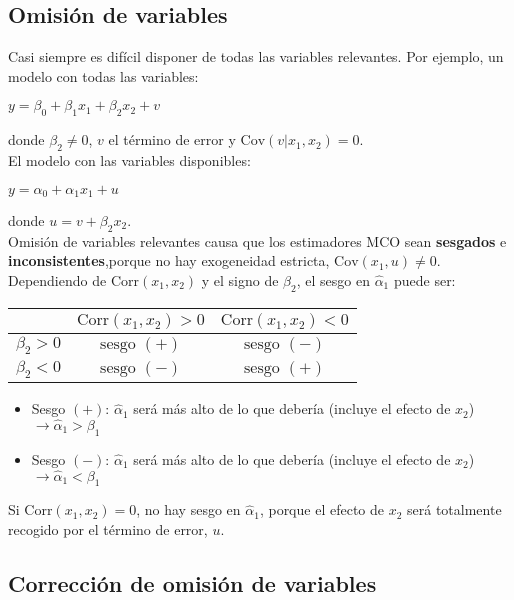 \documentclass[10pt, a4paper, landscape]{extarticle}
\newcommand{\Cov}{\mathrm{Cov}}
\newcommand{\Corr}{\mathrm{Corr}}
\begin{document}
\begin{multicols}{3}
\section*{Omisión de variables}
	Casi siempre es difícil disponer de todas las variables relevantes. Por ejemplo, un modelo con todas las variables:
	\begin{center}
		$y = \beta_0 + \beta_1 x_1 + \beta_2 x_2 + v$
	\end{center}
	\quad donde $\beta_2 \neq 0$, $v$ el término de error y $\Cov(v|x_1,x_2) = 0$. \\
	El modelo con las variables disponibles:
	\begin{center}
		$y = \alpha_0 + \alpha_1 x_1 + u$
	\end{center}
	\quad donde $u = v + \beta_2 x_2$. \\
	Omisión de variables relevantes causa que los estimadores MCO sean \textbf{sesgados} e \textbf{inconsistentes},porque no hay exogeneidad estricta, $\Cov(x_1,u) \neq 0$. Dependiendo de $\Corr(x_1, x_2)$ y el signo de $\beta_2$, el sesgo en $\hat{\alpha}_1$ puede ser:
	\begin{center}
		\begin{tabular}{ c | c  c }
			\multicolumn{1}{c|}{} & $\Corr(x_1, x_2) > 0$ & $\Corr(x_1, x_2) < 0$ \\ \hline
			$\beta_2 > 0$         & $\text{sesgo } (+)$   & $\text{sesgo } (-)$   \\
			$\beta_2 < 0$         & $\text{sesgo } (-)$   & $\text{sesgo } (+)$   \\
		\end{tabular}
	\end{center}
	\begin{itemize}[leftmargin=*]
		\item Sesgo $(+)$: $\hat{\alpha}_1$ será más alto de lo que debería (incluye el efecto de $x_2$) $\rightarrow \hat{\alpha}_1 > \beta_1$
		\item Sesgo $(-)$: $\hat{\alpha}_1$ será más alto de lo que debería (incluye el efecto de $x_2$) $\rightarrow \hat{\alpha}_1 < \beta_1$
	\end{itemize}
	Si $\Corr(x_1,x_2) = 0$, no hay sesgo en $\hat{\alpha}_1$, porque el efecto de $x_2$ será totalmente recogido por el término de error, $u$.
\columnbreak
	\subsection*{Corrección de omisión de variables}

\end{multicols}
\end{document}
